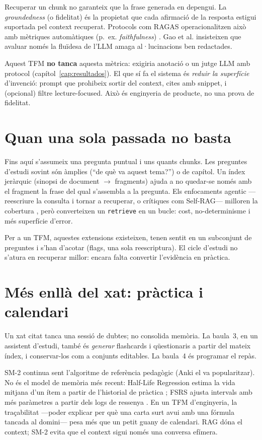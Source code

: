 Recuperar un chunk no garanteix que la frase generada en depengui. La \emph{groundedness} (o fidelitat) és la propietat que cada afirmació de la resposta estigui suportada pel context recuperat. Protocols com RAGAS operacionalitzen això amb mètriques automàtiques (p.~ex. \emph{faithfulness}) \parencite{es2024ragas}. Gao et al. \parencite{gao2024retrieval} insisteixen que avaluar només la fluïdesa de l'LLM amaga al·lucinacions ben redactades.

Aquest TFM \textbf{no tanca} aquesta mètrica: exigiria anotació o un jutge LLM amb protocol (capítol~\ref{cap:resultados}). El que sí fa el sistema és \emph{reduir la superfície} d'invenció: prompt que prohibeix sortir del context, cites amb snippet, i (opcional) filtre lecture-focused. Això és enginyeria de producte, no una prova de fidelitat.

\section{Quan una sola passada no basta}

Fins aquí s'assumeix una pregunta puntual i uns quants chunks. Les preguntes d'estudi sovint són àmplies (``de què va aquest tema?'') o de capítol. Un índex jeràrquic (sinopsi de document $\rightarrow$ fragments) ajuda a no quedar-se només amb el fragment la frase del qual s'assembla a la pregunta. Els enfocaments agentic ---reescriure la consulta i tornar a recuperar, o crítiques com Self-RAG--- milloren la cobertura \parencite{asai2024selfrag}, però converteixen un \texttt{retrieve} en un bucle: cost, no-determinisme i més superfície d'error.

Per a un TFM, aquestes extensions existeixen, tenen sentit en un subconjunt de preguntes i s'han d'acotar (flags, una sola reescriptura). El cicle d'estudi no s'atura en recuperar millor: encara falta convertir l'evidència en pràctica.

\section{Més enllà del xat: pràctica i calendari}

Un xat citat tanca una sessió de dubtes; no consolida memòria. La baula~3, en un assistent d'estudi, també és \emph{generar} flashcards i qüestionaris a partir del mateix índex, i conservar-los com a conjunts editables. La baula~4 és programar el repàs.

SM-2 \parencite{wozniak1990supermemo} continua sent l'algoritme de referència pedagògic (Anki el va popularitzar). No és el model de memòria més recent: Half-Life Regression estima la vida mitjana d'un ítem a partir de l'historial de pràctica \parencite{settles2016hlr}; FSRS ajusta intervals amb més paràmetres a partir dels logs de ressenya \parencite{ye2024fsrs}. En un TFM d'enginyeria, la traçabilitat ---poder explicar per què una carta surt avui amb una fórmula tancada al domini--- pesa més que un petit guany de calendari. RAG dóna el context; SM-2 evita que el context sigui només una conversa efímera.

